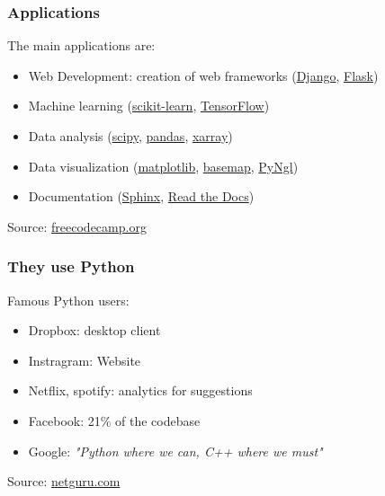 \begin{frame}[fragile]
\frametitle{Applications}

The main applications are:
\vspace{1em}

\begin{itemize}
\item{Web Development: creation of web frameworks (\href{https://www.djangoproject.com/}{Django}, \href{https://www.palletsprojects.com/p/flask/}{Flask})}
\item{Machine learning (\href{https://scikit-learn.org/}{scikit-learn}, \href{https://www.tensorflow.org/}{TensorFlow})}
\item{Data analysis (\href{https://www.scipy.org/}{scipy}, \href{https://pandas.pydata.org/}{pandas}, \href{http://xarray.pydata.org/en/stable/}{xarray})}
\item{Data visualization (\href{http://xarray.pydata.org/en/stable/}{matplotlib}, \href{https://matplotlib.org/basemap/}{basemap}, \href{https://www.pyngl.ucar.edu/}{PyNgl})}
\item{Documentation (\href{https://www.sphinx-doc.org/en/master/}{Sphinx}, \href{https://readthedocs.org/}{Read the Docs})}
\end{itemize}
\vspace{1em}
Source: \href{https://www.freecodecamp.org/news/what-can-you-do-with-python-the-3-main-applications-518db9a68a78/}{freecodecamp.org}
\end{frame}

\begin{frame}[fragile]
\frametitle{They use Python}

Famous Python users:
\vspace{1em}

\begin{itemize}
\item{Dropbox: desktop client}
\item{Instragram: Website}
\item{Netflix, spotify: analytics for suggestions}
\item{Facebook: 21\% of the codebase}
\item{Google: \emph{"Python where we can, C++ where we must"}}
\end{itemize}
\vspace{1em}
Source: \href{https://www.netguru.com/blog/8-top-companies-that-use-python-for-their-apps-examples-of-top-notch-python-applications}{netguru.com}

\end{frame}



